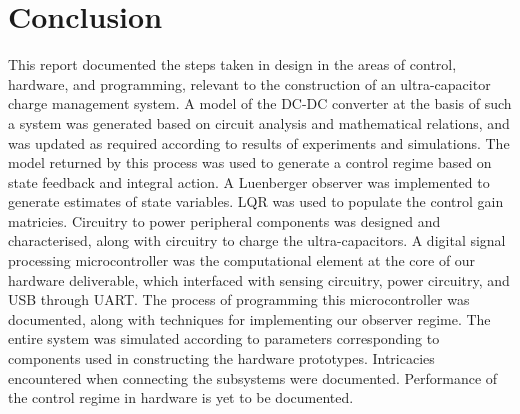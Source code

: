 \section{Conclusion}
This report documented the steps taken in design in the areas of control, hardware, and programming, relevant to the construction of an ultra-capacitor charge management system.
\newpar
A model of the DC-DC converter at the basis of such a system was generated based on circuit analysis and mathematical relations, and was updated as required according to results of experiments and simulations.
\newpar
The model returned by this process was used to generate a control regime based on state feedback and integral action. A Luenberger observer was implemented to generate estimates of state variables. LQR was used to populate the control gain matricies.
\newpar
Circuitry to power peripheral components was designed and characterised, along with circuitry to charge the ultra-capacitors. A digital signal processing microcontroller was the computational element at the core of our hardware deliverable, which interfaced with sensing circuitry, power circuitry, and USB through UART.
\newpar
The process of programming this microcontroller was documented, along with techniques for implementing our observer regime.
\newpar
The entire system was simulated according to parameters corresponding to components used in constructing the hardware prototypes.
\newpar
Intricacies encountered when connecting the subsystems were documented. Performance of the control regime in hardware is yet to be documented.
